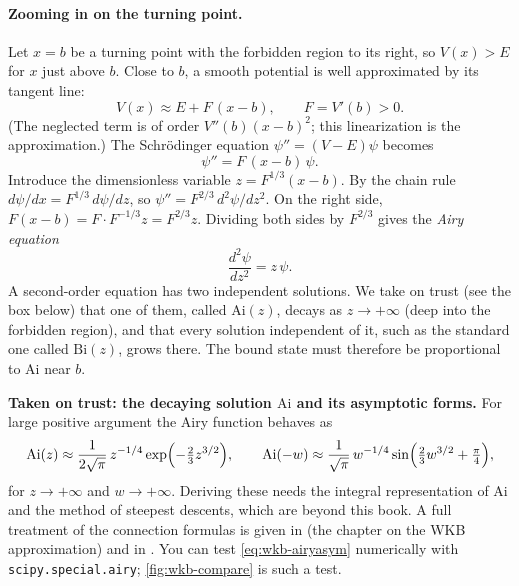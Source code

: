 \paragraph{Zooming in on the turning point.} Let $x=b$ be a turning point with the forbidden region to its right, so $V(x)>E$ for $x$ just above $b$. Close to $b$, a smooth potential is well approximated by its tangent line:
\begin{equation}
V(x)\approx E+F\,(x-b),\qquad F=V'(b)>0.
\label{eq:wkb-linear}
\end{equation}
(The neglected term is of order $V''(b)(x-b)^2$; this linearization is the approximation.) The Schr\"odinger equation $\psi''=(V-E)\psi$ becomes
\begin{equation}
\psi''=F\,(x-b)\,\psi.
\label{eq:wkb-linode}
\end{equation}
Introduce the dimensionless variable $z=F^{1/3}(x-b)$. By the chain rule $d\psi/dx=F^{1/3}\,d\psi/dz$, so $\psi''=F^{2/3}\,d^2\psi/dz^2$. On the right side, $F(x-b)=F\cdot F^{-1/3}z=F^{2/3}z$. Dividing both sides by $F^{2/3}$ gives the \emph{Airy equation}
\begin{equation}
\frac{d^2\psi}{dz^2}=z\,\psi.
\label{eq:wkb-airy}
\end{equation}
A second-order equation has two independent solutions. We take on trust (see the box below) that one of them, called $\mathrm{Ai}(z)$, decays as $z\to+\infty$ (deep into the forbidden region), and that every solution independent of it, such as the standard one called $\mathrm{Bi}(z)$, grows there. The bound state must therefore be proportional to $\mathrm{Ai}$ near $b$.

\begin{beyond}
\textbf{Taken on trust: the decaying solution $\mathrm{Ai}$ and its asymptotic forms.} For large positive argument the Airy function behaves as
\begin{equation}
\mathrm{Ai}(z)\approx\frac{1}{2\sqrt\pi}\,z^{-1/4}\exp\Bigl(-\tfrac23z^{3/2}\Bigr),\qquad
\mathrm{Ai}(-w)\approx\frac{1}{\sqrt\pi}\,w^{-1/4}\sin\Bigl(\tfrac23w^{3/2}+\tfrac\pi4\Bigr),
\label{eq:wkb-airyasym}
\end{equation}
for $z\to+\infty$ and $w\to+\infty$. Deriving these needs the integral representation of $\mathrm{Ai}$ and the method of steepest descents, which are beyond this book. A full treatment of the connection formulas is given in \cite{griffiths} (the chapter on the WKB approximation) and in \cite{rhb}. You can test \cref{eq:wkb-airyasym} numerically with \texttt{scipy.special.airy}; \cref{fig:wkb-compare} is such a test.
\end{beyond}

